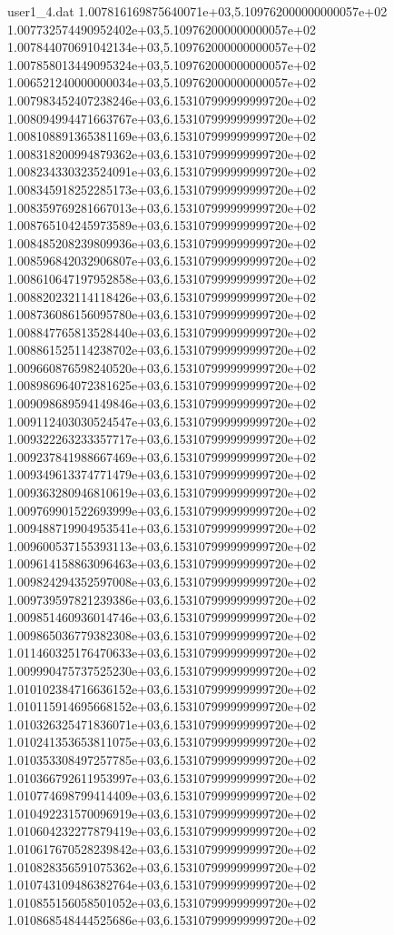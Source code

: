 \begin{filecontents}{user1_4.dat}
1.007816169875640071e+03,5.109762000000000057e+02
1.007732574490952402e+03,5.109762000000000057e+02
1.007844070691042134e+03,5.109762000000000057e+02
1.007858013449095324e+03,5.109762000000000057e+02
1.006521240000000034e+03,5.109762000000000057e+02
1.007983452407238246e+03,6.153107999999999720e+02
1.008094994471663767e+03,6.153107999999999720e+02
1.008108891365381169e+03,6.153107999999999720e+02
1.008318200994879362e+03,6.153107999999999720e+02
1.008234330323524091e+03,6.153107999999999720e+02
1.008345918252285173e+03,6.153107999999999720e+02
1.008359769281667013e+03,6.153107999999999720e+02
1.008765104245973589e+03,6.153107999999999720e+02
1.008485208239809936e+03,6.153107999999999720e+02
1.008596842032906807e+03,6.153107999999999720e+02
1.008610647197952858e+03,6.153107999999999720e+02
1.008820232114118426e+03,6.153107999999999720e+02
1.008736086156095780e+03,6.153107999999999720e+02
1.008847765813528440e+03,6.153107999999999720e+02
1.008861525114238702e+03,6.153107999999999720e+02
1.009660876598240520e+03,6.153107999999999720e+02
1.008986964072381625e+03,6.153107999999999720e+02
1.009098689594149846e+03,6.153107999999999720e+02
1.009112403030524547e+03,6.153107999999999720e+02
1.009322263233357717e+03,6.153107999999999720e+02
1.009237841988667469e+03,6.153107999999999720e+02
1.009349613374771479e+03,6.153107999999999720e+02
1.009363280946810619e+03,6.153107999999999720e+02
1.009769901522693999e+03,6.153107999999999720e+02
1.009488719904953541e+03,6.153107999999999720e+02
1.009600537155393113e+03,6.153107999999999720e+02
1.009614158863096463e+03,6.153107999999999720e+02
1.009824294352597008e+03,6.153107999999999720e+02
1.009739597821239386e+03,6.153107999999999720e+02
1.009851460936014746e+03,6.153107999999999720e+02
1.009865036779382308e+03,6.153107999999999720e+02
1.011460325176470633e+03,6.153107999999999720e+02
1.009990475737525230e+03,6.153107999999999720e+02
1.010102384716636152e+03,6.153107999999999720e+02
1.010115914695668152e+03,6.153107999999999720e+02
1.010326325471836071e+03,6.153107999999999720e+02
1.010241353653811075e+03,6.153107999999999720e+02
1.010353308497257785e+03,6.153107999999999720e+02
1.010366792611953997e+03,6.153107999999999720e+02
1.010774698799414409e+03,6.153107999999999720e+02
1.010492231570096919e+03,6.153107999999999720e+02
1.010604232277879419e+03,6.153107999999999720e+02
1.010617670528239842e+03,6.153107999999999720e+02
1.010828356591075362e+03,6.153107999999999720e+02
1.010743109486382764e+03,6.153107999999999720e+02
1.010855156058501052e+03,6.153107999999999720e+02
1.010868548444525686e+03,6.153107999999999720e+02

\end{filecontents}
